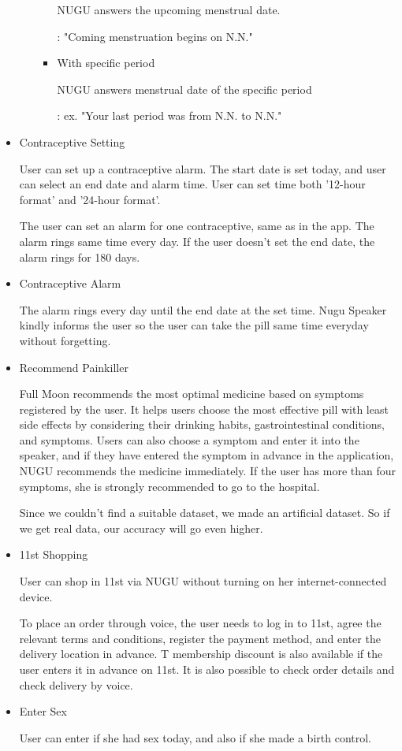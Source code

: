 \documentclass[conference]{IEEEtran}
\begin{document}
\begin{itemize}
\begin{enumerate}
\begin{itemize}
            NUGU answers the upcoming menstrual date. 
            
            : "Coming menstruation begins on N.N."
            \item With specific period 
            
            NUGU answers menstrual date of the specific period
            
            : ex. "Your last period was from N.N. to N.N."
        \end{itemize}
    \end{enumerate}
    \item Contraceptive Setting
    
    User can set up a contraceptive alarm. The start date is set today, and user can select an end date and alarm time. User can set time both '12-hour format' and '24-hour format'.
    
    The user can set an alarm for one contraceptive, same as in the app. The alarm rings same time every day.
    If the user doesn't set the end date, the alarm rings for 180 days.
    \item Contraceptive Alarm
    
    The alarm rings every day until the end date at the set time. Nugu Speaker kindly informs the user so the user can take the pill same time everyday without forgetting. 
    
    \item Recommend Painkiller
    
    Full Moon recommends the most optimal medicine based on symptoms registered by the user. It helps users choose the most effective pill with least side effects by considering their drinking habits, gastrointestinal conditions, and symptoms. Users can also choose a symptom and enter it into the speaker, and if they have entered the symptom in advance in the application, NUGU recommends the medicine immediately. If the user has more than four symptoms, she is strongly recommended to go to the hospital.
    
    Since we couldn't find a suitable dataset, we made an artificial dataset. So if we get real data, our accuracy will go even higher.
    
    \item 11st Shopping

    User can shop in 11st via NUGU without turning on her internet-connected device.
    
    To place an order through voice, the user needs to log in to 11st, agree the relevant terms and conditions, register the payment method, and enter the delivery location in advance.
    T membership discount is also available if the user enters it in advance on 11st.
    It is also possible to check order details and check delivery by voice.
    \item Enter Sex
    
    User can enter if she had sex today, and also if she made a birth control.
\end{itemize}   
\end{document}
